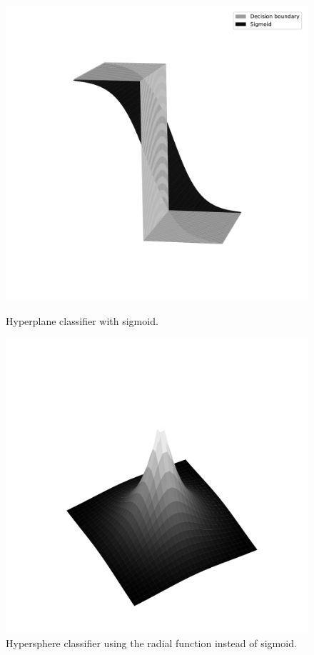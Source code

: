 \begin{figure}[!t]
  \includegraphics[width=\linewidth]{gfx/chap4/hyperplane.pdf}
  \caption{Hyperplane classifier with sigmoid.}\label{hyperplane}
\endminipage\hfill
{}
  \includegraphics[width=\linewidth]{gfx/chap4/hypersphere.pdf}
  \caption{Hypersphere classifier using the radial function instead of sigmoid.}\label{hypersphere}
\endminipage

\end{figure}


